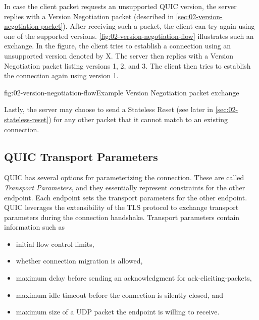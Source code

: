 In case the client packet requests an unsupported QUIC version, the server replies with a Version
Negotiation packet (described in \autoref{sec:02-version-negotiation-packet}). After receiving such
a packet, the client can try again using one of the supported versions.
\autoref{fig:02-version-negotiation-flow} illustrates such an exchange. In the figure, the client
tries to establish a connection using an unsupported version denoted by X. The server then replies
with a Version Negotiation packet listing versions 1, 2, and 3. The client then tries to establish
the connection again using version 1.

\begin{myFigure}{fig:02-version-negotiation-flow}{Example Version Negotiation packet exchange}

\resizebox{\linewidth}{!}{}

\end{myFigure}

Lastly, the server may choose to send a Stateless Reset (see later in
\autoref{sec:02-stateless-reset}) for any other packet that it cannot match to an existing
connection.

\subsection{QUIC Transport Parameters}\label{sec:02-transport-parameters}

QUIC has several options for parameterizing the connection. These are called \textit{Transport
Parameters}, and they essentially represent constraints for the other endpoint. Each endpoint sets
the transport parameters for the other endpoint. QUIC leverages the extensibility of the TLS
protocol to exchange transport parameters during the connection handshake. Transport parameters
contain information such as

\begin{itemize}

  \item initial flow control limits,

  \item whether connection migration is allowed,

  \item maximum delay before sending an acknowledgment for \glspl{ack-eliciting-packet},

  \item maximum idle timeout before the connection is silently closed, and

  \item maximum size of a UDP packet the endpoint is willing to receive.

\end{itemize}

